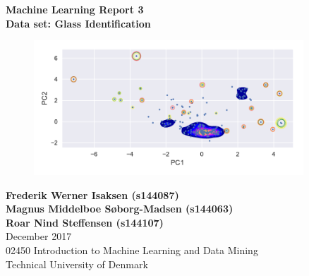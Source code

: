 

\begin{titlepage}
    \begin{center}
        \vspace*{1cm}
        
        \Huge
        \vspace{0.5cm}
        \textbf{Machine Learning Report 3\\
        Data set: Glass Identification}

        \vspace{1cm}
        
        \begin{figure}[H]
        \centering
        \includegraphics[width=0.9\textwidth]{fig/2DdensityPC.pdf}
        \end{figure}
 
        \vspace{1cm}
        \Large
        \textbf{Frederik Werner Isaksen (s144087) \\
                Magnus Middelboe Søborg-Madsen (s144063) \\
                Roar Nind Steffensen (s144107)} \\
        
        \vfill
        \vspace{0.8cm}
        \Large
        December 2017\\
        02450 Introduction to Machine Learning and Data Mining\\
        Technical University of Denmark\\
        \vspace*{0.8cm}
    \end{center}
\end{titlepage}

